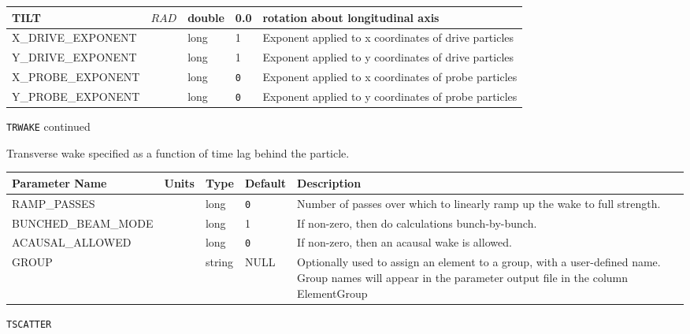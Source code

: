\begin{tabular}{|l|l|l|l|p{\descwidth}|}
TILT & $RAD$ & double &  0.0 & rotation about longitudinal axis  \\ \hline 
X\_DRIVE\_EXPONENT &  & long &   1               & Exponent applied to x coordinates of drive particles  \\ \hline 
Y\_DRIVE\_EXPONENT &  & long &   1               & Exponent applied to y coordinates of drive particles  \\ \hline 
X\_PROBE\_EXPONENT &  & long &  \verb|0| & Exponent applied to x coordinates of probe particles  \\ \hline 
Y\_PROBE\_EXPONENT &  & long &  \verb|0| & Exponent applied to y coordinates of probe particles  \\ \hline 
\end{tabular}

\newpage
\begin{center}{\Large\verb|TRWAKE| continued}\end{center}
Transverse wake specified as a function of time lag behind the particle.
\\
\begin{tabular}{|l|l|l|l|p{\descwidth}|} \hline
Parameter Name & Units & Type & Default & Description \\ \hline 
RAMP\_PASSES &  & long &  \verb|0| & Number of passes over which to linearly ramp up the wake to full strength.  \\ \hline 
BUNCHED\_BEAM\_MODE &  & long &   1               & If non-zero, then do calculations bunch-by-bunch.  \\ \hline 
ACAUSAL\_ALLOWED &  & long &  \verb|0| & If non-zero, then an acausal wake is allowed.  \\ \hline 
GROUP &  & string & NULL & Optionally used to assign an element to a group, with a user-defined name.  Group names will appear in the parameter output file in the column ElementGroup  \\ \hline 
\end{tabular}

\vspace*{0.5in}

\newpage
\begin{center}{\Large\verb|TSCATTER|}\end{center}
